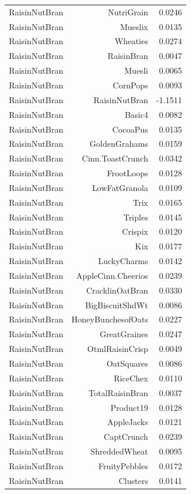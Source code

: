 \begin{longtable}{@{}lrr@{}}
RaisinNutBran & NutriGrain & 0.0246 \\
RaisinNutBran & Mueslix & 0.0135 \\
RaisinNutBran & Wheaties & 0.0274 \\
RaisinNutBran & RaisinBran & 0.0047 \\
RaisinNutBran & Muesli & 0.0065 \\
RaisinNutBran & CornPops & 0.0093 \\
RaisinNutBran & RaisinNutBran & -1.1511 \\
RaisinNutBran & Basic4 & 0.0082 \\
RaisinNutBran & CocoaPus & 0.0135 \\
RaisinNutBran & GoldenGrahams & 0.0159 \\
RaisinNutBran & Cinn.ToastCrunch & 0.0342 \\
RaisinNutBran & FrootLoops & 0.0128 \\
RaisinNutBran & LowFatGranola & 0.0109 \\
RaisinNutBran & Trix & 0.0165 \\
RaisinNutBran & Triples & 0.0145 \\
RaisinNutBran & Crispix & 0.0120 \\
RaisinNutBran & Kix & 0.0177 \\
RaisinNutBran & LuckyCharms & 0.0142 \\
RaisinNutBran & AppleCinn.Cheerios & 0.0239 \\
RaisinNutBran & CracklinOatBran & 0.0330 \\
RaisinNutBran & BigBiscuitShdWt & 0.0086 \\
RaisinNutBran & HoneyBunchesofOats & 0.0227 \\
RaisinNutBran & GreatGraines & 0.0247 \\
RaisinNutBran & OtmlRaisinCrisp & 0.0049 \\
RaisinNutBran & OatSquares & 0.0086 \\
RaisinNutBran & RiceChex & 0.0110 \\
RaisinNutBran & TotalRaisinBran & 0.0037 \\
RaisinNutBran & Product19 & 0.0128 \\
RaisinNutBran & AppleJacks & 0.0121 \\
RaisinNutBran & CaptCrunch & 0.0239 \\
RaisinNutBran & ShreddedWheat & 0.0095 \\
RaisinNutBran & FruityPebbles & 0.0172 \\
RaisinNutBran & Clusters & 0.0141 \\

\end{longtable}
